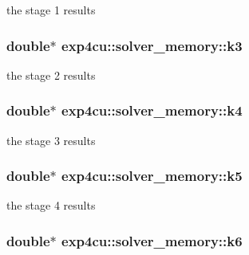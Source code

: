 the stage 1 results 

\subsubsection[{\texorpdfstring{k3}{k3}}]{\setlength{\rightskip}{0pt plus 5cm}double$\ast$ exp4cu\+::solver\+\_\+memory\+::k3}\hypertarget{structexp4cu_1_1solver__memory_ad874f97ba264e3cefb19482eef2a729d}{}\label{structexp4cu_1_1solver__memory_ad874f97ba264e3cefb19482eef2a729d}


the stage 2 results 

\subsubsection[{\texorpdfstring{k4}{k4}}]{\setlength{\rightskip}{0pt plus 5cm}double$\ast$ exp4cu\+::solver\+\_\+memory\+::k4}\hypertarget{structexp4cu_1_1solver__memory_a060f44ce2caacb3fc536671b591e11a2}{}\label{structexp4cu_1_1solver__memory_a060f44ce2caacb3fc536671b591e11a2}


the stage 3 results 

\subsubsection[{\texorpdfstring{k5}{k5}}]{\setlength{\rightskip}{0pt plus 5cm}double$\ast$ exp4cu\+::solver\+\_\+memory\+::k5}\hypertarget{structexp4cu_1_1solver__memory_a749746fa09b01076ee56c0402d003fb7}{}\label{structexp4cu_1_1solver__memory_a749746fa09b01076ee56c0402d003fb7}


the stage 4 results 

\subsubsection[{\texorpdfstring{k6}{k6}}]{\setlength{\rightskip}{0pt plus 5cm}double$\ast$ exp4cu\+::solver\+\_\+memory\+::k6}\hypertarget{structexp4cu_1_1solver__memory_a8ccbe7fd464f064245b77c2df44956ef}{}\label{structexp4cu_1_1solver__memory_a8ccbe7fd464f064245b77c2df44956ef}


